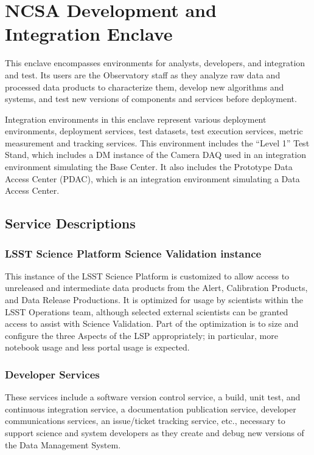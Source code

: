 \documentclass[DM,toc,lsstdraft]{lsstdoc}
\begin{document}
\section{NCSA Development and Integration Enclave}\label{ncsa-development-integration-enclave}

This enclave encompasses environments for analysts, developers, and
integration and test. Its users are the Observatory staff as they
analyze raw data and processed data products to characterize them,
develop new algorithms and systems, and test new versions of components
and services before deployment.

Integration environments in this enclave represent various deployment environments, deployment services, test datasets, test execution services, metric measurement and tracking services.
This environment includes the ``Level 1'' Test Stand, which includes a DM instance of the Camera DAQ used in an integration environment simulating the Base Center.
It also includes the Prototype Data Access Center (PDAC), which is an integration environment simulating a Data Access Center.

\subsection{Service Descriptions}\label{ncsa-dev-int-service-descriptions}

\subsubsection{LSST Science Platform Science Validation
instance}\label{lsst-science-platform-science-validation-instance}

This instance of the LSST Science Platform is customized to allow access
to unreleased and intermediate data products from the Alert, Calibration
Products, and Data Release Productions. It is optimized for usage by
scientists within the LSST Operations team, although selected external
scientists can be granted access to assist with Science Validation. Part
of the optimization is to size and configure the three Aspects of the
LSP appropriately; in particular, more notebook usage and less portal
usage is expected.

\subsubsection{Developer Services}\label{developer-services}

These services include a software version control service, a build, unit test, and continuous integration service, a documentation publication service, developer communications services, an issue/ticket tracking service, etc., necessary to support science and system developers as they create and debug new versions of the Data Management System.
\end{document}
